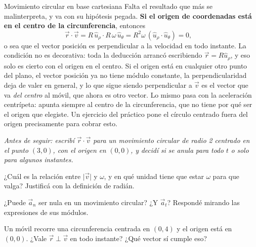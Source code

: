 \documentclass[11pt,openany]{book}
\begin{document}
\begin{bloque}{Movimiento circular en base cartesiana}
Falta el resultado que más se malinterpreta, y va con su hipótesis pegada. \textbf{Si el origen de coordenadas está en el centro de la circunferencia}, entonces
\[
\vec r\cdot\vec v = R\,\hat u_\rho \cdot R\,\omega\,\hat u_\theta = R^2\omega\,(\hat u_\rho\cdot\hat u_\theta) = 0,
\]
o sea que el vector posición es perpendicular a la velocidad en todo instante. La condición no es decorativa: toda la deducción arrancó escribiendo $\vec r = R\hat u_\rho$, y eso solo es cierto con el origen en el centro. Si el origen está en cualquier otro punto del plano, el vector posición ya no tiene módulo constante, la perpendicularidad deja de valer en general, y lo que sigue siendo perpendicular a $\vec v$ es el vector que va \emph{del centro} al móvil, que ahora es otro vector. Lo mismo pasa con la aceleración centrípeta: apunta siempre al centro de la circunferencia, que no tiene por qué ser el origen que elegiste. Un ejercicio del práctico pone el círculo centrado fuera del origen precisamente para cobrar esto.

\textit{Antes de seguir: escribí $\vec r\cdot\vec v$ para un movimiento circular de radio 2 centrado en el punto $(3,0)$, con el origen en $(0,0)$, y decidí si se anula para todo $t$ o solo para algunos instantes.}
\end{bloque}

\begin{chequeo}
\item ¿Cuál es la relación entre $\lvert\vec v\rvert$ y $\omega$, y en qué unidad tiene que estar $\omega$ para que valga? Justificá con la definición de radián.
\item ¿Puede $\vec a_n$ ser nula en un movimiento circular? ¿Y $\vec a_t$? Respondé mirando las expresiones de sus módulos.
\item Un móvil recorre una circunferencia centrada en $(0,4)$ y el origen está en $(0,0)$. ¿Vale $\vec r \perp \vec v$ en todo instante? ¿Qué vector sí cumple eso?
\end{chequeo}
\end{document}
